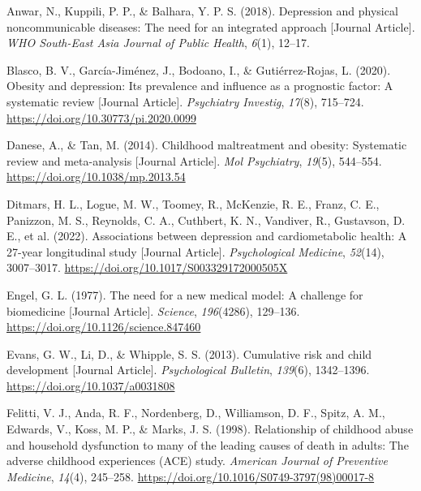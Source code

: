 \documentclass[
  letterpaper,
  DIV=11,
  numbers=noendperiod]{scrreport}
\newlength{\cslhangindent}
\newenvironment{CSLReferences}[2] %
 {\begin{list}{}{%
  \setlength{\itemindent}{0pt}
  \setlength{\leftmargin}{0pt}
  \setlength{\parsep}{0pt}
  \ifodd #1
   \setlength{\leftmargin}{\cslhangindent}
   \setlength{\itemindent}{-1\cslhangindent}
  \fi
  \setlength{\itemsep}{#2\baselineskip}}}
 {\end{list}}
\begin{document}
\label{refs--1}
\begin{CSLReferences}{1}{0}
Anwar, N., Kuppili, P. P., \& Balhara, Y. P. S. (2018). Depression and
physical noncommunicable diseases: The need for an integrated approach
{[}Journal Article{]}. \emph{WHO South-East Asia Journal of Public
Health}, \emph{6}(1), 12--17.

Blasco, B. V., García-Jiménez, J., Bodoano, I., \& Gutiérrez-Rojas, L.
(2020). Obesity and depression: Its prevalence and influence as a
prognostic factor: A systematic review {[}Journal Article{]}.
\emph{Psychiatry Investig}, \emph{17}(8), 715--724.
\url{https://doi.org/10.30773/pi.2020.0099}

Danese, A., \& Tan, M. (2014). Childhood maltreatment and obesity:
Systematic review and meta-analysis {[}Journal Article{]}. \emph{Mol
Psychiatry}, \emph{19}(5), 544--554.
\url{https://doi.org/10.1038/mp.2013.54}

Ditmars, H. L., Logue, M. W., Toomey, R., McKenzie, R. E., Franz, C. E.,
Panizzon, M. S., Reynolds, C. A., Cuthbert, K. N., Vandiver, R.,
Gustavson, D. E., et al. (2022). Associations between depression and
cardiometabolic health: A 27-year longitudinal study {[}Journal
Article{]}. \emph{Psychological Medicine}, \emph{52}(14), 3007--3017.
\url{https://doi.org/10.1017/S003329172000505X}

Engel, G. L. (1977). The need for a new medical model: A challenge for
biomedicine {[}Journal Article{]}. \emph{Science}, \emph{196}(4286),
129--136. \url{https://doi.org/10.1126/science.847460}

Evans, G. W., Li, D., \& Whipple, S. S. (2013). Cumulative risk and
child development {[}Journal Article{]}. \emph{Psychological Bulletin},
\emph{139}(6), 1342--1396. \url{https://doi.org/10.1037/a0031808}

Felitti, V. J., Anda, R. F., Nordenberg, D., Williamson, D. F., Spitz,
A. M., Edwards, V., Koss, M. P., \& Marks, J. S. (1998). Relationship of
childhood abuse and household dysfunction to many of the leading causes
of death in adults: The adverse childhood experiences (ACE) study.
\emph{American Journal of Preventive Medicine}, \emph{14}(4), 245--258.
\url{https://doi.org/10.1016/S0749-3797(98)00017-8}


\end{CSLReferences}
\end{document}
